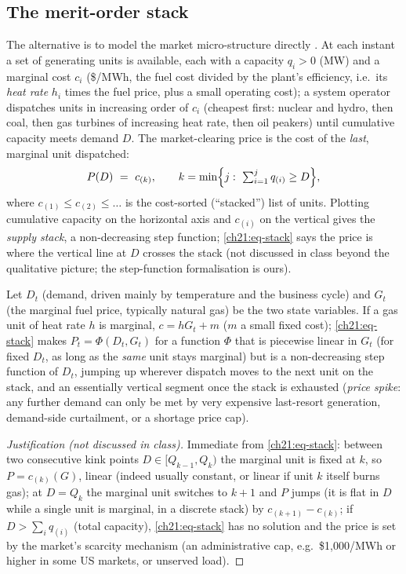 \begin{paracol}{2}
\subsection{The merit-order stack}\label{ch21:sec-merit}
The alternative is to model the market micro-structure directly . At each instant a set of generating units is available, each with a capacity $q_i>0$ (MW) and
a marginal cost $c_i$ (\$/MWh, the fuel cost divided by the plant's efficiency, i.e.\ its \emph{heat rate} $h_i$ times the fuel price, plus a small operating cost); a system
operator dispatches units in increasing order of $c_i$ (cheapest first: nuclear and hydro, then coal, then gas turbines of increasing heat rate, then oil peakers) until
cumulative capacity meets demand $D$. The market-clearing price is the cost of the \emph{last}, marginal unit dispatched:
\begin{equation}\label{ch21:eq-stack}
P(D)\ =\ c_{(k)},\qquad k=\min\Bigl\{j:\ \textstyle\sum_{i=1}^{j}q_{(i)}\ge D\Bigr\},
\end{equation}
where $c_{(1)}\le c_{(2)}\le\dots$ is the cost-sorted (``stacked'') list of units. Plotting cumulative capacity on the horizontal axis and $c_{(i)}$ on the vertical gives the
\emph{supply stack}, a non-decreasing step function; \eqref{ch21:eq-stack} says the price is where the vertical line at $D$ crosses the stack (not discussed in class beyond the
qualitative picture; the step-function formalisation is ours).

\begin{proposition}\label{ch21:prop-stack}
Let $D_t$ (demand, driven mainly by temperature and the business cycle) and $G_t$ (the marginal fuel price, typically natural gas) be the two state variables. If a
gas unit of heat rate $h$ is marginal, $c=hG_t+m$ ($m$ a small fixed cost); \eqref{ch21:eq-stack} makes $P_t=\Phi(D_t,G_t)$ for a function $\Phi$ that is piecewise linear
in $G_t$ (for fixed $D_t$, as long as the \emph{same} unit stays marginal) but is a non-decreasing step function of $D_t$, jumping up wherever dispatch moves to the next unit on the stack, and an
essentially vertical segment once the stack is exhausted (\emph{price spike}: any further demand can only be met by very expensive last-resort generation, demand-side curtailment,
or a shortage price cap).
\end{proposition}
\begin{proof}[Justification (not discussed in class)]
Immediate from \eqref{ch21:eq-stack}: between two consecutive kink points $D\in[Q_{k-1},Q_k)$ the marginal unit is fixed at $k$, so $P=c_{(k)}(G)$, linear (indeed usually
constant, or linear if unit $k$ itself burns gas); at $D=Q_k$ the marginal unit switches to $k+1$ and $P$ jumps (it is flat in $D$ while a single unit is
marginal, in a discrete stack) by $c_{(k+1)}-c_{(k)}$; if $D>\sum_iq_{(i)}$ (total capacity), \eqref{ch21:eq-stack} has no solution and the price is set
by the market's scarcity mechanism (an administrative cap, e.g.\ \$1{,}000/MWh or higher in some US markets, or unserved load).
\end{proof}


\end{paracol}
